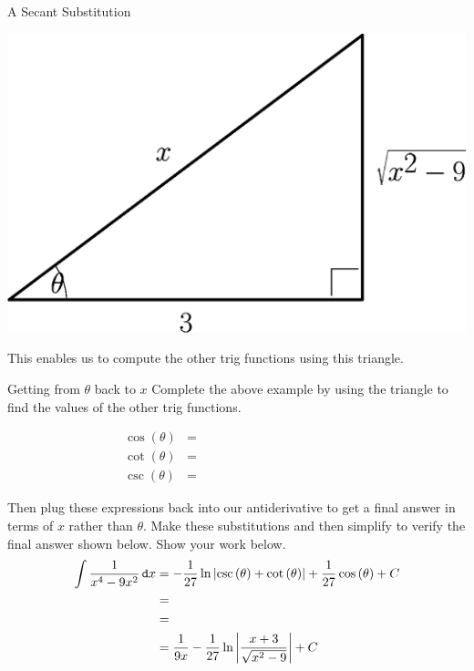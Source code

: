 \begin{example}{A Secant Substitution}
\begin{center}
\includegraphics[scale=0.4]{ChapterAntidiff/Figures/sectri_crop}
\end{center}
This enables us to compute the other trig functions using this triangle.  
\end{example}

\begin{exercise}{Getting from $\theta$ back to $x$ \Coffeecup }
Complete the above example by using the triangle to find the values of the other trig functions. \vspace{-.3in}
\begin{center}
\begin{align*}
\cos(\theta)&= \hspace{2in}\\
\cot(\theta)&= \hspace{2in}\\
\csc(\theta)&= \hspace{2in}
\end{align*}
\end{center}

Then plug these expressions back into our antiderivative to get a final answer in terms of $x$ rather than $\theta$.  Make these substitutions and then simplify to verify the final answer shown below.  Show your work below.  \begin{align*}
\int \frac{1}{x^4-9x^2}\mathop{}\!\mathtt{d} x &= -\frac{1}{27}\ln\left|\csc\left(\theta\right)+\cot\left(\theta\right)\right|+\frac{1}{27}\cos\left(\theta\right)+C \\
&= \\
&= \\
&= \frac{1}{9x}-\frac{1}{27}\ln\left| \frac{x+3}{\sqrt{x^2-9}}\right|+C
\end{align*}

\end{exercise}

